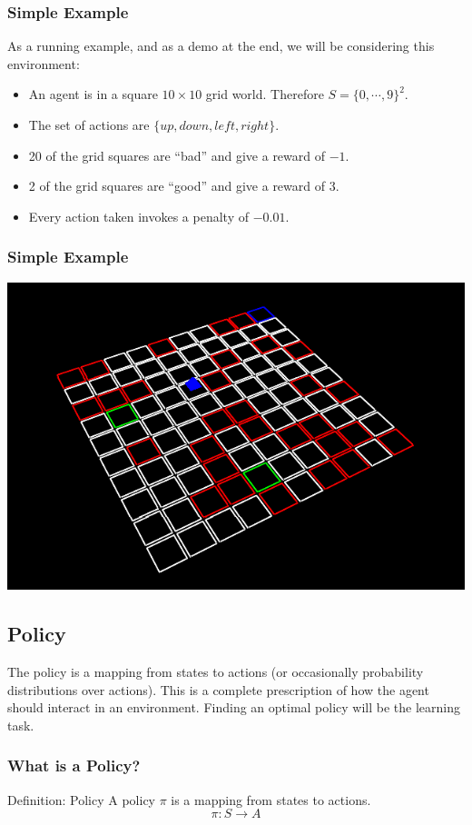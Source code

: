 \documentclass[ignorenonframetext]{beamer}
\begin{document}
\begin{frame}
	\frametitle{Simple Example}
	\begin{block}{ As a running example, and as a demo at the end, we
		will be considering this environment:}
		\begin{itemize}
			\item An agent is in a square $10\times 10$ grid world.  Therefore $S =
				\{0,\cdots,9\}^2$.  
			\item The set of actions are $\{up, down, left,
				right\}$.  
			\item 20 of the grid squares are ``bad'' and give a reward
				of $-1$.  
			\item2 of the grid squares are ``good'' and give a reward of
				$3$.  
			\item Every action taken invokes a penalty of $-0.01$.
		\end{itemize}
	\end{block}
\end{frame}

\begin{frame}
	\frametitle{Simple Example}
	\includegraphics[scale=0.5]{example.png}
\end{frame}
\subsection{Policy}

The policy is a mapping from states to actions (or occasionally
probability distributions over actions).  This is a complete
prescription of how the agent should interact in an environment.
Finding an optimal policy will be the learning task.

\begin{frame}
	\frametitle{What is a Policy?}
	\begin{block}{Definition: Policy}
		A policy $\pi$ is a mapping from states to actions.
		\[ \pi: S \rightarrow A \]
	\end{block}
\end{frame}
\end{document}
